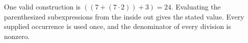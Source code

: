One valid construction is $\boxed{((7+(7\cdot 2))+3)=24}$. Evaluating the parenthesized subexpressions from the inside out gives the stated value. Every supplied occurrence is used once, and the denominator of every division is nonzero.

